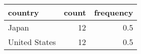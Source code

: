 \begin{table}[!h]
\centering
\begin{tabular}[t]{lrr}
\toprule
country & count & frequency\\
\midrule
Japan & 12 & 0.5\\
United States & 12 & 0.5\\
\bottomrule
\end{tabular}
\end{table}
